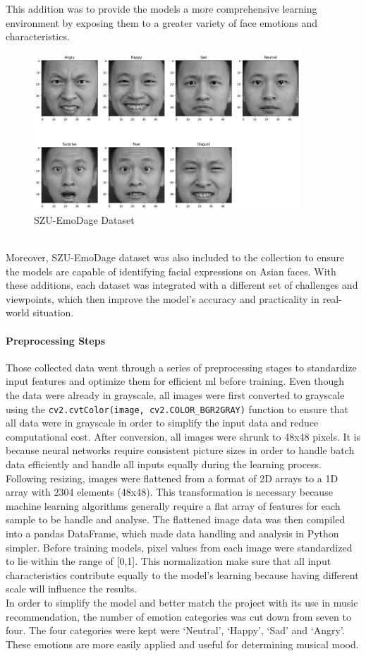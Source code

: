 This addition was to provide the models a more comprehensive learning environment by exposing them to a greater variety of face emotions and characteristics.
\begin{figure}[h!]
    \centering
    \includegraphics[width=10cm]{Images/szuemodage.png}
    \caption{SZU-EmoDage Dataset}
    \label{fig:szu-emodage}
\end{figure}
\\
\indent Moreover, SZU-EmoDage \citep{who_2022_a} dataset was also included to the collection to ensure the models are capable of identifying facial expressions on Asian faces.
With these additions, each dataset was integrated with a different set of challenges and viewpoints, which then improve the model's accuracy and practicality in real-world situation.
\paragraph{Preprocessing Steps}
Those collected data went through a series of preprocessing stages to standardize input features and optimize them for efficient \gls{ml} before training.
Even though the data were already in grayscale, all images were first converted to grayscale using the \texttt{cv2.cvtColor(image, cv2.COLOR\_BGR2GRAY)} function to ensure that all data were in grayscale in order to simplify the input data and reduce computational cost.
After conversion, all images were shrunk to 48x48 pixels.
It is because neural networks require consistent picture sizes in order to handle batch data efficiently and handle all inputs equally during the learning process.
\\
\indent Following resizing, images were flattened from a format of 2D arrays to a 1D array with 2304 elements (48x48). 
This transformation is necessary because machine learning algorithms generally require a flat array of features for each sample to be handle and analyse.
The flattened image data was then compiled into a pandas DataFrame, which made data handling and analysis in Python simpler.
Before training models, pixel values from each image were standardized to lie within the range of [0,1]. 
This normalization make sure that all input characteristics contribute equally to the model's learning because having different scale will influence the results.
\\
\indent In order to simplify the model and better match the project with its use in music recommendation, the number of emotion categories was cut down from seven to four.
The four categories were kept were `Neutral', `Happy', `Sad' and `Angry'.
These emotions are more easily applied and useful for determining musical mood.
